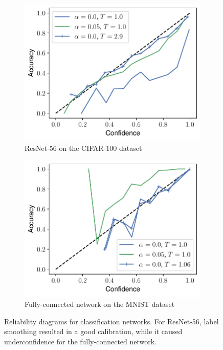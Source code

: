 \begin{figure}[ht]
    \begin{subfigure}{.49\textwidth}
    \centering
    \includegraphics[width=\linewidth]{figures/reliability_resnet.pdf}
    \caption{ResNet-56 on the CIFAR-100 dataset}
    \label{fig:acc_conf_resnet56}
\end{subfigure}
\hfill
\begin{subfigure}{.49\textwidth}
    \centering
    \includegraphics[width=\linewidth]{figures/reliability_mnist.pdf}
    \caption{Fully-connected network on the MNIST dataset}
    \label{fig:acc_conf_mnist}
\end{subfigure}
\caption{Reliability diagrams for classification networks. For ResNet-56, label smoothing resulted in a good calibration, while it caused underconfidence for the fully-connected network.}
\end{figure}

